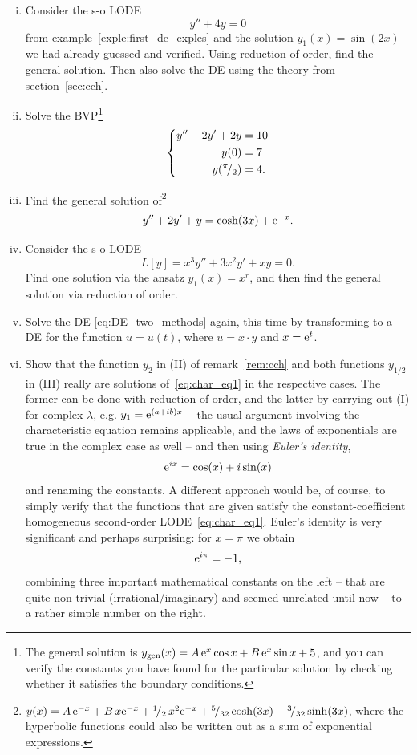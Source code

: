 \begin{exercise}
\begin{enumerate}[(i)]
		\item Consider the s-o LODE	\[y''+4y=0\]
		from example~\ref{exple:first_de_exples} and the solution $y_1(x)=\sin(2x)$ we had already guessed and verified. Using reduction of order, find the general solution. Then also solve the DE using the theory from section~\ref{sec:cch}.
		\item Solve the BVP\footnote{The general solution is $y_{\text{gen}}(x)= A \, \mathrm{e}^x \cos x + B \, \mathrm{e}^x \sin x + 5$, and you can verify the constants you have found for the particular solution by checking whether it satisfies the boundary conditions.} 
		\[ \left\{\begin{split}
			y''-2y'+2y & = 10 \\ y(0) & = 7 \\ y({}^{\pi}\!/_{2}) & = 4.
		\end{split}\right. \]
		\item Find the general solution of\footnote{$y(x)=A\,\mathrm{e}^{-x}+B\,x\mathrm{e}^{-x}+{}^{1}\!/_{2}\,x^2\mathrm{e}^{-x}
			+{}^{5}\!/_{32}\cosh(3x)-{}^{3}\!/_{32}\sinh(3x)$, where the hyperbolic functions could also be written out as a sum of exponential expressions.} 
		\[ y''+2y'+y=\cosh(3x)+\mathrm{e}^{-x} .\]
		\item Consider the s-o LODE
		\begin{equation}
		\label{eq:DE_two_methods}
		L[y] = x^3 y'' + 3 x^2 y' + x y = 0.
		\end{equation}
		Find one solution via the ansatz $y_1(x) = x^r$, and then find the general solution via reduction of order.
		\item Solve the DE \eqref{eq:DE_two_methods} again, this time by transforming to a DE for the function $u=u(t)$, where $u = x \cdot y$ and $x=\mathrm{e}^t$.
		\item  Show that the function $y_2$ in (II) of remark~\ref{rem:cch} and both functions $y_{1/2}$ in (III) really are solutions of~\eqref{eq:char_eq1} in the respective cases. The former can be done with reduction of order, and	the latter by carrying out (I) for complex $\lambda$, e.g. $y_1=\mathrm{e}^{(a+ib)x}$ -- the usual argument involving the characteristic equation remains applicable, and the laws of exponentials are true in the complex case as well -- and then using \emph{Euler's identity},
		\[ \mathrm{e}^{ix} = \cos(x)+i\sin(x) \]
		and renaming the constants. A different approach would be, of course, to simply verify that the functions that are given satisfy the constant-coefficient homogeneous second-order LODE~\eqref{eq:char_eq1}. Euler's identity is very significant and perhaps surprising: for $x=\pi$ we obtain
		\[ \mathrm{e}^{i\pi} = -1, \]
		combining three important mathematical constants on the left -- that are quite non-trivial (irrational/imaginary) and seemed unrelated until now -- to a rather simple number on the right.
\end{enumerate}
\end{exercise}


